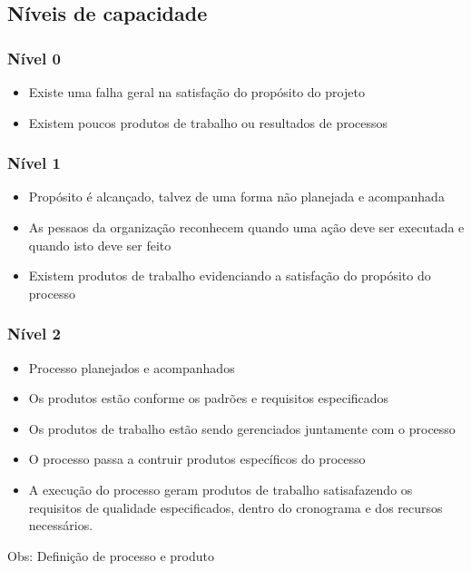 \documentclass{article}
\begin{document}
\subsection{Níveis de capacidade}
	\subsubsection{Nível 0}
		\begin{itemize}
		\item Existe uma falha geral na satisfação do propósito do projeto
		\item Existem poucos produtos de trabalho ou resultados de processos
		\end{itemize}				
		
	\subsubsection{Nível 1}
		\begin{itemize}
		\item Propósito é alcançado, talvez de uma forma não planejada e acompanhada
		\item As pessaos da organização reconhecem quando uma ação deve ser executada e quando isto deve ser feito
		\item Existem produtos de trabalho evidenciando a satisfação do propósito do processo		
				
		\end{itemize}		

	\subsubsection{Nível 2}
		\begin{itemize}
		\item Processo planejados e acompanhados
		\item Os produtos estão conforme os padrões e requisitos especificados
		\item Os produtos de trabalho estão sendo gerenciados juntamente com o processo		
		\item O processo passa a contruir produtos específicos do processo
		\item A execução do processo geram produtos de trabalho satisafazendo os requisitos de qualidade especificados, dentro do cronograma e dos recursos necessários.
		
		\end{itemize}
		
		Obs: Definição de processo e produto
\end{document}
